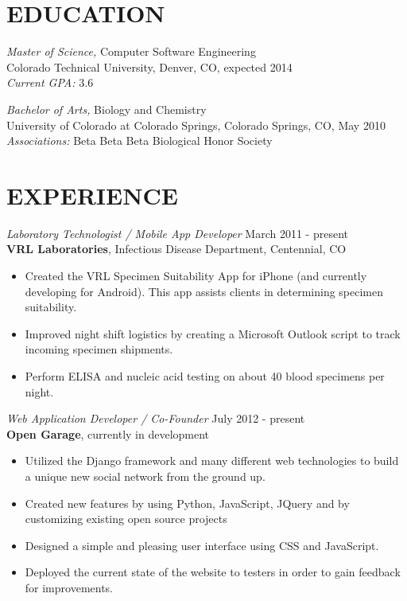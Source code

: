 \documentclass[margin]{res}
\begin{document}
\begin{resume}
\section{EDUCATION} 
		{\sl Master of Science,} Computer Software Engineering \\
		Colorado Technical University, Denver, CO, expected 2014 \\
		{\sl \indent Current GPA: } 3.6
		
		{\sl Bachelor of Arts,} Biology and Chemistry \\
                University of Colorado at Colorado Springs, Colorado Springs, CO, 
                May 2010 \\ 
		{\sl Associations:} Beta Beta Beta Biological Honor Society
 
\section{EXPERIENCE}
		{\sl Laboratory Technologist / Mobile App Developer} \hfill March 2011 - present \\
                	{\bf VRL Laboratories},
                	Infectious Disease Department, Centennial, CO 
                 	\begin{itemize}  \itemsep -2pt %
		\item Created the VRL Specimen Suitability App for iPhone (and currently developing for Android). 
			This app assists clients in determining specimen suitability.
                	\item	Improved night shift logistics by creating a Microsoft Outlook script
			to track incoming specimen shipments.
		\item	Perform ELISA and nucleic acid testing on about 40 blood specimens per night.
                	\end{itemize}
 
                {\sl Web Application Developer / Co-Founder} \hfill            July 2012 - present \\
                {\bf Open Garage},
		currently in development
                 	\begin{itemize}  \itemsep -2pt %
		\item Utilized the Django framework and many different web technologies to build a unique new social network from the ground up.
		\item Created new features by using Python, JavaScript, JQuery and by customizing existing open source projects
		\item Designed a simple and pleasing user interface using CSS and JavaScript.
		\item Deployed the current state of the website to testers in order to gain feedback for improvements.
                 	\end{itemize} 

\end{resume}
\end{document}
